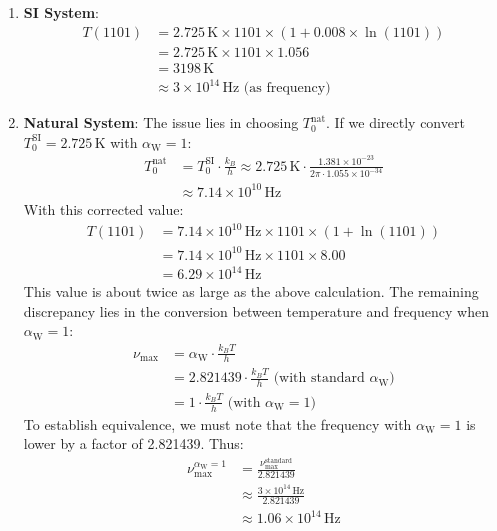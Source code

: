 \documentclass[12pt,a4paper]{article}
\newcommand{\alphaW}{\alpha_{\text{W}}}
\begin{document}
	\begin{enumerate}
		\item \textbf{SI System}:
		\begin{align}
			T(1101) &= 2.725 \, \text{K} \times 1101 \times (1 + 0.008 \times \ln(1101)) \\
			&= 2.725 \, \text{K} \times 1101 \times 1.056 \\
			&= 3198 \, \text{K} \\
			&\approx 3 \times 10^{14} \, \text{Hz} \text{ (as frequency)}
		\end{align}
		\item \textbf{Natural System}:
		The issue lies in choosing \(T_0^{\text{nat}}\). If we directly convert \(T_0^{\text{SI}} = 2.725 \, \text{K}\) with \(\alphaW = 1\):
		\begin{align}
			T_0^{\text{nat}} &= T_0^{\text{SI}} \cdot \frac{k_B}{h} \approx 2.725 \, \text{K} \cdot \frac{1.381 \times 10^{-23}}{2\pi \cdot 1.055 \times 10^{-34}} \\
			&\approx 7.14 \times 10^{10} \, \text{Hz}
		\end{align}
		With this corrected value:
		\begin{align}
			T(1101) &= 7.14 \times 10^{10} \, \text{Hz} \times 1101 \times (1 + \ln(1101)) \\
			&= 7.14 \times 10^{10} \, \text{Hz} \times 1101 \times 8.00 \\
			&= 6.29 \times 10^{14} \, \text{Hz}
		\end{align}
		This value is about twice as large as the above calculation. The remaining discrepancy lies in the conversion between temperature and frequency when \(\alphaW = 1\):
		\begin{align}
			\nu_{\text{max}} &= \alphaW \cdot \frac{k_B T}{h} \\
			&= 2.821439 \cdot \frac{k_B T}{h} \text{ (with standard \(\alphaW\))} \\
			&= 1 \cdot \frac{k_B T}{h} \text{ (with \(\alphaW = 1\))}
		\end{align}
		To establish equivalence, we must note that the frequency with \(\alphaW = 1\) is lower by a factor of 2.821439. Thus:
		\begin{align}
			\nu_{\text{max}}^{\alphaW = 1} &= \frac{\nu_{\text{max}}^{\text{standard}}}{2.821439} \\
			&\approx \frac{3 \times 10^{14} \, \text{Hz}}{2.821439} \\
			&\approx 1.06 \times 10^{14} \, \text{Hz}
		\end{align}

\end{enumerate}
\end{document}
